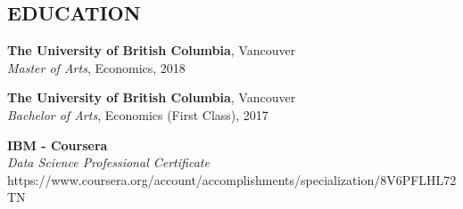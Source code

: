 \documentclass[margin]{res}
\begin{document}
\begin{resume}
\section{EDUCATION}
\textbf{The University of British Columbia}, Vancouver\\
{\sl Master of Arts}, Economics, 2018

\textbf{The University of British Columbia}, Vancouver\\
{\sl Bachelor of Arts}, Economics (First Class), 2017

\textbf{IBM - Coursera}\\
{\sl Data Science Professional Certificate} \\ 
https://www.coursera.org/account/accomplishments/specialization/8V6PFLHL72TN




\end{resume}
\(\)
\end{document}
